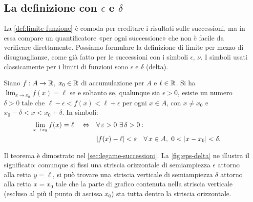 \subsection{La definizione con \texorpdfstring{$\epsilon$ e $\delta$}{epsilon e delta}}

La \cref{def:limite-funzione} è comoda per ereditare i risultati sulle successioni, ma
in essa compare un quantificatore «per ogni successione» che non è facile da verificare
direttamente. Possiamo formulare la definizione di limite per mezzo di disuguaglianze,
come già fatto per le successioni con i simboli $\epsilon$, $\nu$. I simboli usati
classicamente per i limiti di funzioni sono $\epsilon$ e $\delta$ (delta).

\begin{teorema}\label{teo:eps-delta}
Siano $f:A\to\mathbb{R}$, $x_{0}\in\mathbb{R}$ di accumulazione per $A$ e $\ell\in\mathbb{R}$. Si ha
$\lim_{x\to x_{0}}f(x)=\ell$ se e soltanto se, qualunque sia $\epsilon>0$, esiste un
numero $\delta>0$ tale che $\ell-\epsilon<f(x)<\ell+\epsilon$ per ogni $x\in A$, con
$x\neq x_{0}$ e $x_{0}-\delta<x<x_{0}+\delta$. In simboli:
\begin{equation}\label{eq:eps-delta}
\begin{split}
  \lim_{x\to x_{0}}f(x)=\ell \quad\sse\quad
  &\perogni\epsilon>0\ \esiste\delta>0 :\\
  &\abs{f(x)-\ell}<\epsilon \quad\perogni x\in A,\ 0<\abs{x-x_{0}}<\delta .
\end{split}
\end{equation}
\end{teorema}

Il teorema è dimostrato nel \cref{sec:legame-successioni}. La \cref{fig:eps-delta} ne
illustra il significato: comunque si fissi una striscia orizzontale di semiampiezza
$\epsilon$ attorno alla retta $y=\ell$, si può trovare una striscia verticale di
semiampiezza $\delta$ attorno alla retta $x=x_{0}$ tale che la parte di grafico contenuta
nella striscia verticale (escluso al più il punto di ascissa $x_{0}$) sta tutta dentro
la striscia orizzontale.

